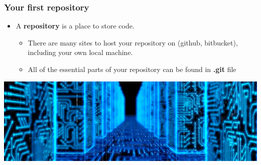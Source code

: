 \documentclass{beamer}
\begin{document}
\begin{frame}[fragile]
\frametitle{Your first repository}


\begin{itemize}
\item A \textbf{repository} is a place to store code.
\begin{itemize}
\item There are many sites to host your repository on (github, bitbucket), including your own local machine.
\item All of the essential parts of your repository can be found in \textbf{.git} file
\end{itemize}

\end{itemize}

\includegraphics[width=\textwidth]{Storage.jpg}

\end{frame}
\end{document}
